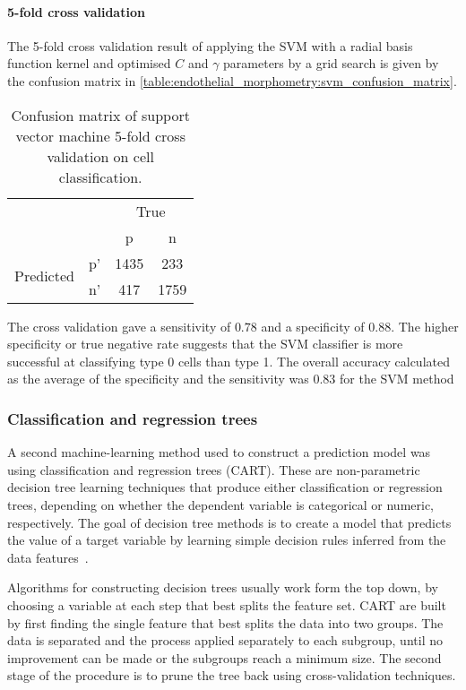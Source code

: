 \paragraph{5-fold cross validation}
The 5-fold cross validation result of applying the SVM with a radial basis function kernel and  optimised $C$ and $\gamma$ parameters by a grid search is given by the confusion matrix in \autoref{table:endothelial_morphometry:svm_confusion_matrix}.

\begin{table}[htbp]
\caption[Confusion matrix of SVM cross validation on cell classification]{Confusion matrix of support vector machine 5-fold cross validation on cell classification.}
\label{table:endothelial_morphometry:svm_confusion_matrix}
\centering
\begin{tabular}{cc|cc}
	\multicolumn{2}{c}{}&\multicolumn{2}{c}{True}\\
	\multicolumn{2}{c|}{}& p & n\\
	\cline{2-4}
	\multirow{2}{*}{Predicted}& p' & 1435 & 233\\ & n' & 417 & 1759\\
\end{tabular}
\end{table}

The cross validation gave a sensitivity of $0.78$ and a specificity of $0.88$. The higher specificity or true negative rate suggests that the SVM classifier is more successful at classifying type 0 cells than type 1. The overall accuracy calculated as the average of the specificity and the sensitivity was $0.83$ for the SVM method

\subsubsection{Classification and regression trees}
A second machine-learning method used to construct a prediction model was using classification and regression trees (CART). These are non-parametric decision tree learning techniques that produce either classification or regression trees, depending on whether the dependent variable is categorical or numeric, respectively. The goal of decision tree methods is to create a model that predicts the value of a target variable by learning simple decision rules inferred from the data features~\cite{Breiman1984}.

Algorithms for constructing decision trees usually work form the top down, by choosing a variable at each step that best splits the feature set. CART are built by first finding the single feature that best splits the data into two groups. The data is separated and the process applied separately to each subgroup, until no improvement can be made or the subgroups reach a minimum size. The second stage of the procedure is to prune the tree back using cross-validation techniques.

